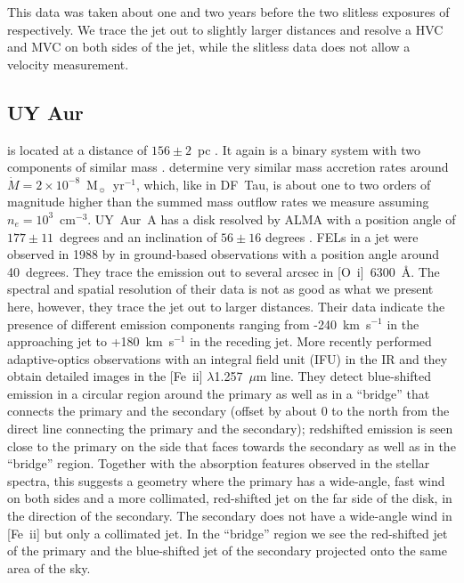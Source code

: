 \documentclass[twocolumn,trackchanges]{aastex62}
\begin{document}
This data was taken about one and two years before the two slitless exposures of \citet{2004ApJ...609..261H} respectively. We trace the jet out to slightly larger distances and resolve a HVC and MVC on both sides of the jet, while the slitless data does not allow a velocity measurement.


\subsection{UY Aur}

 is  located at a distance of $156\pm2$~pc
\citep{2016A&A...595A...1G,2018A&A...616A...1G}. It again is a binary system
with two components of similar mass \citep[M0 and M2,
  see][]{2003ApJ...583..334H}. \citet{2003ApJ...583..334H} determine very
similar mass accretion rates around
$\dot M=2\times10^{-8}$~M$_{\sun}$~yr$^{-1}$, which, like in DF~Tau, is about
one to two orders of magnitude higher than the summed mass outflow rates we
measure assuming $n_e=10^3$~cm$^{-3}$.
UY~Aur~A has a disk resolved by ALMA with a position angle of $177\pm11$~degrees and an inclination of $56\pm16$ degrees \citep{2014ApJ...784...62A}. FELs in a jet were observed in 1988 by \citet{1997A&AS..126..437H} in ground-based observations with a position angle around 40~degrees. They trace the emission out to several arcsec in [O~{\sc i}]~6300~\AA{}. The spectral and spatial resolution of their data is not as good as what we present here, however, they trace the jet out to larger distances. Their data indicate the presence of different emission components ranging from -240~km~s$^{-1}$ in the approaching jet to +180~km~s$^{-1}$ in the receding jet. More recently \citet{2014ApJ...786...63P} performed adaptive-optics observations with an integral field unit (IFU) in the IR and they obtain detailed images in the [Fe~{\sc ii}] $\lambda$1.257~$\mu$m line. They detect blue-shifted emission in a circular region around the primary as well as in a ``bridge'' that connects the primary and the secondary (offset by about 0 to the north from the direct line connecting the primary and the secondary); redshifted emission is seen close to the primary on the side that faces towards the secondary as well as in the ``bridge'' region. Together with the absorption features observed in the stellar spectra, this suggests a geometry where the primary has a wide-angle, fast wind on both sides and a more collimated, red-shifted jet on the far side of the disk, in the direction of the secondary. The secondary does not have a wide-angle wind in [Fe~{\sc ii}] but only a collimated jet. In the ``bridge'' region we see the red-shifted jet of the primary and the blue-shifted jet of the secondary projected onto the same area of the sky.
\end{document}
